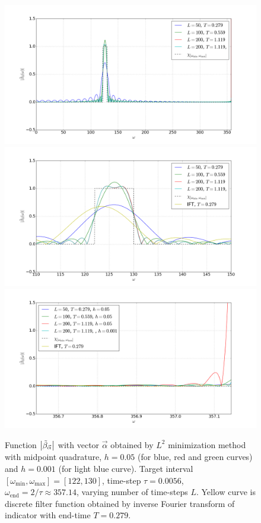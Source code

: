 \documentclass[a4paper,11pt,bibliography=totoc,listof=totoc,headinclude=true,cleardoublepage=empty,oneside]{scrbook}
\newcommand{\dffv}{\Tilde{\beta}_{\Vec{\alpha}}}
\newcommand{\e}{\mathrm{end}}
\begin{document}
\begin{figure}
    \centering
    \includegraphics[width=0.75\linewidth]{latex//images//l2_minim/Figure_4.png}
    \includegraphics[width=0.75\linewidth]{latex//images//l2_minim/Figure_5.png}
    \includegraphics[width=0.75\linewidth]{latex//images//l2_minim/Figure_6.png}
    \caption{Function $\left|\dffv\right|$ with vector $\Vec{\alpha}$ obtained by $L^2$ minimization method with midpoint quadrature, $h=0.05$ (for blue, red and green curves) and $h=0.001$ (for light blue curve). Target interval $\left[\omega_{\min}, \omega_{\max} \right] = [122, 130]$, time-step $\tau = 0.0056$, $\omega_\e = 2/\tau \approx 357.14$, varying number of time-steps $L$. Yellow curve is discrete filter function obtained by inverse Fourier transform of indicator with end-time $T = 0.279$.}
    \label{fig:l2 ex2}
\end{figure}



 
%

\end{document}
